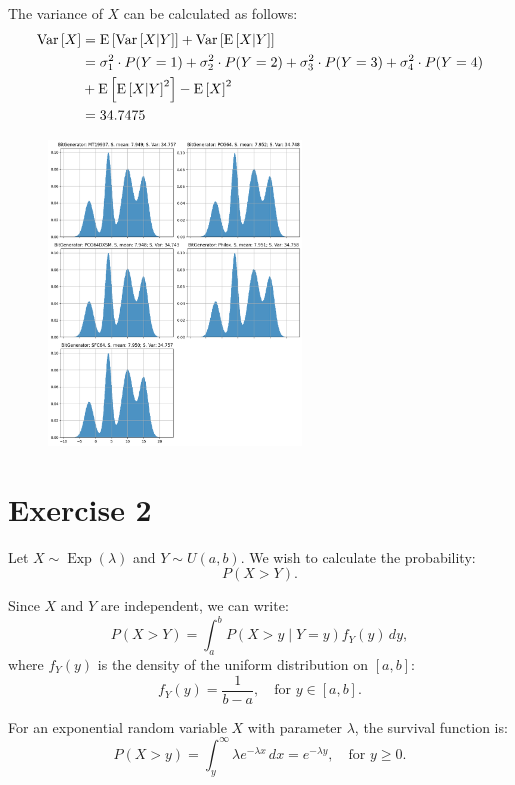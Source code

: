 \documentclass[a4paper,12pt]{article}
\begin{document}
The variance of $X$ can be calculated as follows:
\begin{equation*}
\begin{split}
\operatorname{Var}\left[X\right] & = \operatorname{E}\left[\operatorname{Var}\left[X|Y\right]\right] + \operatorname{Var}\left[\operatorname{E}\left[X|Y\right]\right] \\
& = \sigma^2_1 \cdot P(Y=1) + \sigma^2_2 \cdot P(Y=2) + \sigma^2_3 \cdot P(Y=3) + \sigma^2_4 \cdot P(Y=4) \\
& + \operatorname{E}\left[\operatorname{E}\left[X|Y\right]^2\right] - \operatorname{E}\left[X\right]^2 \\
& = 34.7475
\end{split}
\end{equation*}

\begin{figure}[h]
    \includegraphics[width=0.6\textwidth]{ex1-plot.png}
\end{figure}

\section*{Exercise 2}

Let $X \sim \operatorname{Exp}(\lambda)$ and $Y \sim U(a,b)$. We wish to calculate the probability:
\[
P(X > Y).
\]

Since $X$ and $Y$ are independent, we can write:
\[
P(X > Y) = \int_a^b P(X > y \mid Y = y) f_Y(y) \, dy,
\]
where $f_Y(y)$ is the density of the uniform distribution on $[a,b]$:
\[
f_Y(y) = \frac{1}{b-a}, \quad \text{for } y \in [a,b].
\]

For an exponential random variable $X$ with parameter $\lambda$, the survival function is:
\[
P(X > y) = \int_y^\infty \lambda e^{-\lambda x} \, dx = e^{-\lambda y}, \quad \text{for } y \ge 0.
\]
\end{document}
